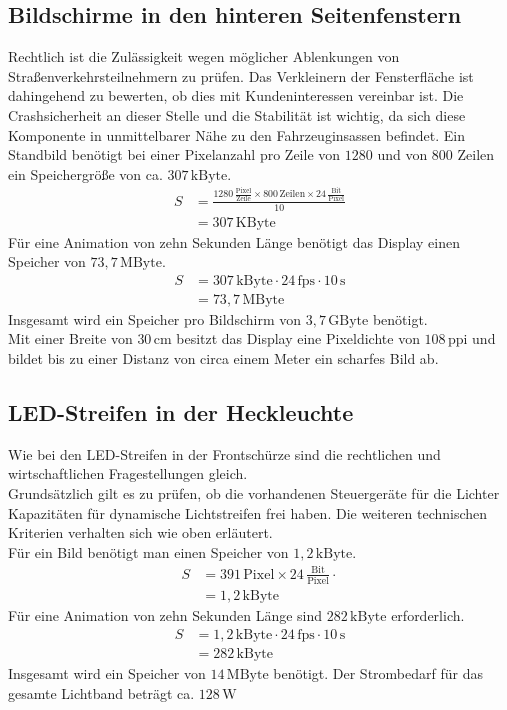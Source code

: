 \subsection{Bildschirme in den hinteren Seitenfenstern}
Rechtlich ist die Zulässigkeit wegen möglicher Ablenkungen von Straßenverkehrsteilnehmern zu prüfen.
Das Verkleinern der Fensterfläche ist dahingehend zu bewerten, ob dies mit Kundeninteressen vereinbar ist.
Die Crashsicherheit an dieser Stelle und die Stabilität ist wichtig, da sich diese Komponente in unmittelbarer Nähe zu den Fahrzeuginsassen befindet.
Ein Standbild benötigt bei einer Pixelanzahl pro Zeile von $ 1280 $ und von $ 800 $ Zeilen ein Speichergröße von ca. $ 307\,\mathrm{kByte}$. 
\begin{align}
	S &= \frac{1280\,\frac{\mathrm{Pixel}}{\mathrm{Zeile}}\times 800\,\mathrm{Zeilen} \times 24\,\frac{\mathrm{Bit}}{\mathrm{Pixel}}}{10} \\
	&= 307\,\mathrm{KByte}
\end{align}
Für eine Animation von zehn Sekunden Länge benötigt das Display einen Speicher von $ 73,7\,\mathrm{MByte}$.
\begin{align}
	S &= 307\,\mathrm{kByte} \cdot 24\,\mathrm{fps} \cdot 10\,\mathrm{s}\\
	&= 73,7\,\mathrm{MByte}
\end{align}
Insgesamt wird ein Speicher pro Bildschirm von $ 3,7\,\mathrm{GByte} $ benötigt. \\
Mit einer Breite von $ 30\,\mathrm{cm} $ besitzt das Display eine Pixeldichte von $ 108\,\mathrm{ppi} $ und bildet bis zu einer Distanz von circa einem Meter ein scharfes Bild ab.
\subsection{LED-Streifen in der Heckleuchte}
Wie bei den LED-Streifen in der Frontschürze sind die rechtlichen und wirtschaftlichen Fragestellungen gleich. \\
Grundsätzlich gilt es zu prüfen, ob die vorhandenen Steuergeräte für die Lichter Kapazitäten für dynamische Lichtstreifen frei haben.
Die weiteren technischen Kriterien verhalten sich wie oben erläutert. \\
Für ein Bild benötigt man einen Speicher von $ 1,2\,\mathrm{kByte} $.
\begin{align}
	S &= 391\,\mathrm{Pixel} \times 24\,\frac{\mathrm{Bit}}{\mathrm{Pixel}} \cdot \\
	&= 1,2\,\mathrm{kByte}
\end{align}
Für eine Animation von zehn Sekunden Länge sind $ 282\,\mathrm{kByte} $ erforderlich.
\begin{align}
	S &= 1,2\,\mathrm{kByte} \cdot 24\,\mathrm{fps} \cdot 10\,\mathrm{s} \\
	&= 282\,\mathrm{kByte}
\end{align}
Insgesamt wird ein Speicher von $ 14\,\mathrm{MByte} $ benötigt.
Der Strombedarf für das gesamte Lichtband beträgt ca. $ 128\,\mathrm{W} $
